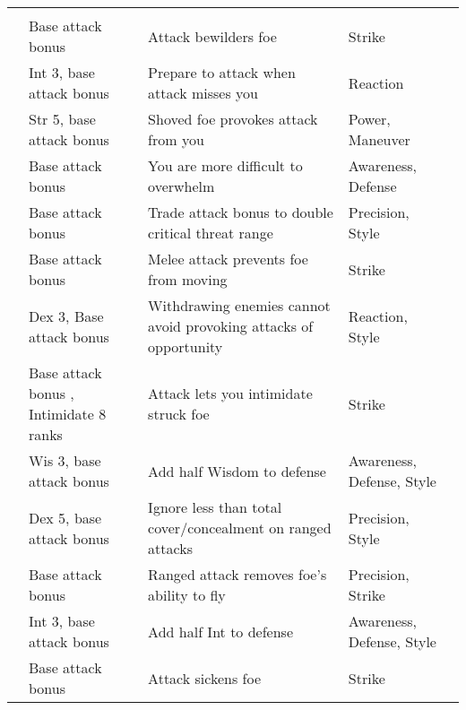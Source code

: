 {\begin{longtabu}{>{\lcol}p{10em} >{\lcol}p{15em} >{\lcol}X >{\lcol}p{6em} >{\lcol}p{3em}}
\midrule
{} &  &  &  &  \\
 & Base attack bonus  & Attack bewilders foe & Strike &  \\
 & Int 3, base attack bonus  & Prepare to attack when attack misses you & Reaction &  \\
 & Str 5, base attack bonus  & Shoved foe provokes attack from you & Power, Maneuver &  \\
 & Base attack bonus  & You are more difficult to overwhelm & Awareness, Defense &  \\
 & Base attack bonus  & Trade attack bonus to double critical threat range & Precision, Style &  \\
 & Base attack bonus  & Melee attack prevents foe from moving & Strike &  \\
 & Dex 3, Base attack bonus  & Withdrawing enemies cannot avoid provoking attacks of opportunity & Reaction, Style &  \\
 & Base attack bonus , Intimidate 8 ranks & Attack lets you intimidate struck foe & Strike &  \\
 & Wis 3, base attack bonus  & Add half Wisdom to defense & Awareness, Defense, Style &  \\
 & Dex 5, base attack bonus  & Ignore less than total cover/concealment on ranged attacks & Precision, Style &  \\
 & Base attack bonus  & Ranged attack removes foe's ability to fly & Precision, Strike &  \\
 & Int 3, base attack bonus  & Add half Int to defense & Awareness, Defense, Style &  \\
 & Base attack bonus  & Attack sickens foe & Strike &  \\

\end{longtabu}}
